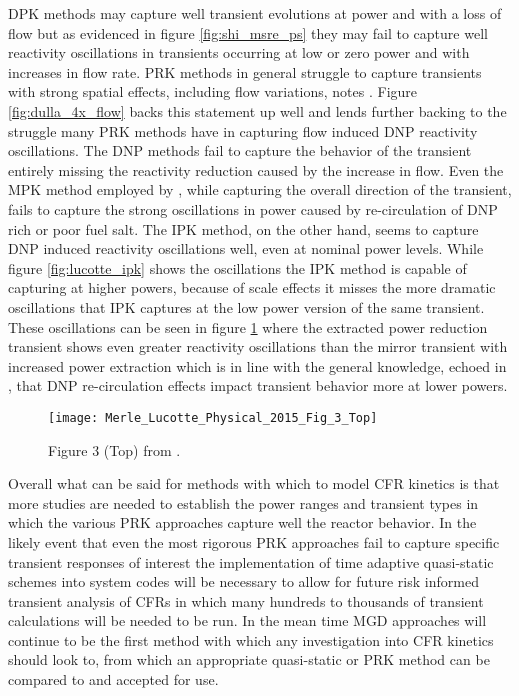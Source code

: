 \documentclass[review]{elsarticle}
\begin{document}
\par DPK methods may capture well transient evolutions at power and with a loss
of flow but as evidenced in figure \ref{fig:shi_msre_ps} they may fail to
capture well reactivity oscillations in transients occurring at low or zero power
and with increases in flow rate. PRK methods in general struggle to capture
transients with strong spatial effects, including flow variations, notes 
\cite{dulla_models_2005}. Figure \ref{fig:dulla_4x_flow} backs this statement
up well and lends further backing to the struggle many PRK methods have
in capturing flow induced DNP reactivity oscillations. The DNP methods fail
to capture the behavior of the transient entirely missing the reactivity
reduction caused by the increase in flow. Even the MPK method employed by
\cite{dulla_models_2005}, while capturing the overall direction of the
transient, fails to capture the strong oscillations in power caused by
re-circulation of DNP rich or poor fuel salt. The IPK method, on the other hand,
seems to capture DNP induced reactivity oscillations well, even at nominal
power levels. While figure \ref{fig:lucotte_ipk} shows the oscillations the
IPK method is capable of capturing at higher powers, because of scale effects
it misses the more dramatic oscillations that IPK captures at the low power
version of the same transient. These oscillations can be seen in figure
\ref{fig:lucotte_ipk_reac} where the extracted power reduction transient shows
even greater reactivity oscillations than the mirror transient with increased
power extraction which is in line with the general knowledge, echoed in
\cite{zanetti_development_2016}, that DNP re-circulation effects impact
transient behavior more at lower powers.

\begin{figure}[h]
   \centering
   \texttt{[image: Merle\_Lucotte\_Physical\_2015\_Fig\_3\_Top]}
   \caption{Figure 3 (Top) from \cite{merle-lucotte_physical_2015}.} 
   \label{fig:lucotte_ipk_reac}
\end{figure}

\par Overall what can be said for methods with which to model CFR kinetics
is that more studies are needed to establish the power ranges and transient
types in which the various PRK approaches capture well the reactor behavior.
In the likely event that even the most rigorous PRK approaches fail to capture
specific transient responses of interest the implementation of time adaptive
quasi-static schemes into system codes will be necessary to allow for future
risk informed transient analysis of CFRs in which many hundreds to thousands
of transient calculations will be needed to be run. In the mean time MGD
approaches will continue to be the first method with which any investigation
into CFR kinetics should look to, from which an appropriate quasi-static or
PRK method can be compared to and accepted for use.
\end{document}
